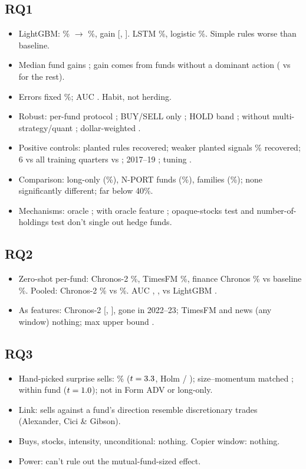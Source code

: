 \documentclass[11pt]{article}
\begin{document}
\subsection*{RQ1}
\begin{itemize}
  \item LightGBM: \baseM\% $\to$ \lgbM\%, gain \gainM{} [\gainloM, \gainhiM].
  LSTM \lstmM\%, logistic \logitM\%. Simple rules worse than baseline.
  \item Median fund gains \medgainM; gain comes from \nlowbaseM{} funds without a
  dominant action (\gainlowbaseM{} vs \gainrestM{} for the rest).
  \item Errors fixed \errredM\%; AUC \aucbsM. Habit, not herding.
  \item Robust: per-fund protocol \protfundgainM; BUY/SELL only \bsgainM; HOLD
  band \hbgainM; without multi-strategy/quant \exmqgain; dollar-weighted \dwgain.
  \item Positive controls: planted rules recovered; weaker planted signals
  \grrecsixty\% recovered; 6 vs all training quarters \lcsixM{} vs \lcallM;
  2017--19 \earlyM; tuning \tunedM.
  \item Comparison: long-only \gainL{} (\errredL\%), N-PORT funds \gainN{}
  (\errredN\%), families \gainP{} (\errredP\%); none significantly different;
  far below 40\%.
  \item Mechanisms: oracle \oraclegainM; with oracle feature \lgboraclegainM;
  opaque-stocks test and number-of-holdings test don't single out hedge funds.
\end{itemize}
\subsection*{RQ2}
\begin{itemize}
  \item Zero-shot per-fund: Chronos-2 \chronosM\%, TimesFM \timesfmM\%,
  finance Chronos \fintextM\% vs baseline \baseM\%. Pooled: Chronos-2
  \chronospooledM\% vs \basepooledM\%. AUC \aucchronosM, \auctimesfmM,
  \aucfintextM{} vs LightGBM \auclgbM.
  \item As features: Chronos-2 \rqtwochronos{} [\rqtwochronoslo, \rqtwochronoshi],
  gone in 2022--23; TimesFM and news (any window) nothing; max upper bound
  \rqtwomaxhi.
\end{itemize}
\subsection*{RQ3}
\begin{itemize}
  \item Hand-picked surprise sells: \pdsellsM\% ($t=3.3$, Holm
  \pdsellsholmM{} / \pdsellsholmallM); size--momentum matched \pdsellschM;
  within fund \wfsellsM{} ($t=1.0$); not in Form ADV or long-only.
  \item Link: sells against a fund's direction resemble discretionary trades
  (Alexander, Cici \& Gibson).
  \item Buys, stocks, intensity, unconditional: nothing. Copier window: nothing.
  \item Power: can't rule out the mutual-fund-sized effect.
\end{itemize}
\end{document}
